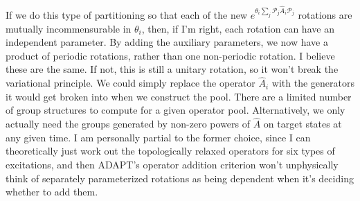 \documentclass{article}
\begin{document}
If we do this type of partitioning so that each of the new $e^{\theta_i\sum_j\mathcal{P}_j\hat{A}_i\mathcal{P}_j}$ rotations are mutually incommensurable in $\theta_i$, then, if I'm right, each rotation can have an independent parameter.  By adding the auxiliary parameters, we now have a product of periodic rotations, rather than one non-periodic rotation.  I believe these are the same.  If not, this is still a unitary rotation, so it won't break the variational principle.  We could simply replace the operator $\hat{A}_i$ with the generators it would get broken into when we construct the pool.  There are a limited number of group structures to compute for a given operator pool.   Alternatively, we only actually need the groups generated by non-zero powers of $\hat{A}$ on target states at any given time.  I am personally partial to the former choice, since I can theoretically just work out the topologically relaxed operators for six types of excitations, and then ADAPT's operator addition criterion won't unphysically think of separately parameterized rotations as being dependent when it's deciding whether to add them.    
\end{document}
